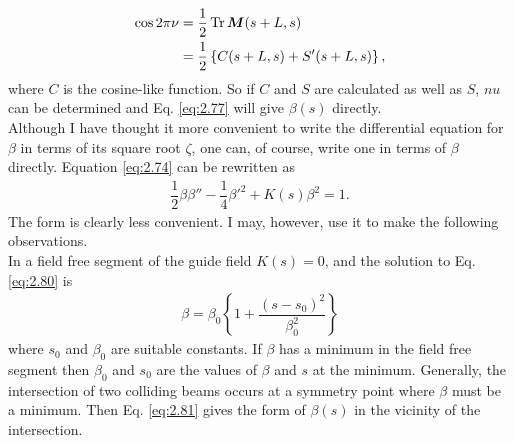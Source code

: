 \begin{align}
	\cos2\pi\nu &= \dfrac{1}{2}\operatorname{Tr}\bm{M}(s+L,s) \\
    	&= \dfrac{1}{2}\left\lbrace C(s+L,s)+S'(s+L,s) \right\rbrace,
\end{align}
where $C$ is the cosine-like function. So if $C$ and $S$ are calculated as well as $S$, $nu$ can be determined and Eq. \eqref{eq:2.77} will give $\beta(s)$ directly.\\
Although I have thought it more convenient to write the differential equation for $\beta$ in terms of its square root $\zeta$, one can, of course, write one in terms of $\beta$ directly. Equation \eqref{eq:2.74} can be rewritten as
\begin{align}\label{eq:2.80}
	\dfrac{1}{2}\beta\beta'' - \dfrac{1}{4}\beta'^2 + K(s)\beta^2 = 1.
\end{align}
The form is clearly less convenient. I may, however, use it to make the following observations.\\
In a field free segment of the guide field $K(s) = 0$, and the solution to Eq. \eqref{eq:2.80} is
\begin{align}\label{eq:2.81}
	\beta = \beta_0 \left\lbrace 1 + \dfrac{(s-s_0)^2}{\beta_0^2} \right\rbrace
\end{align}
where $s_0$ and $\beta_0$ are suitable constants. If $\beta$ has a minimum in the field free segment then $\beta_0$ and $s_0$ are the values of $\beta$ and $s$ at the minimum. Generally, the
intersection of two colliding beams occurs at a symmetry point where $\beta$ must be a minimum. Then Eq. \eqref{eq:2.81} gives the form of $\beta(s)$ in the vicinity of the intersection.

